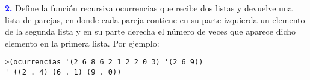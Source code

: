 \newpage\textbf{\textcolor{blue}{2.}} \Large
Define la función recursiva ocurrencias que recibe dos listas y devuelve una lista de parejas,
en donde cada pareja contiene en su parte izquierda un elemento de la segunda lista y en su
parte derecha el número de veces que aparece dicho elemento en la primera lista. Por ejemplo:

\begin{lstlisting}
>(ocurrencias '(2 6 8 6 2 1 2 2 0 3) '(2 6 9))
' ((2 . 4) (6 . 1) (9 . 0))
\end{lstlisting}
